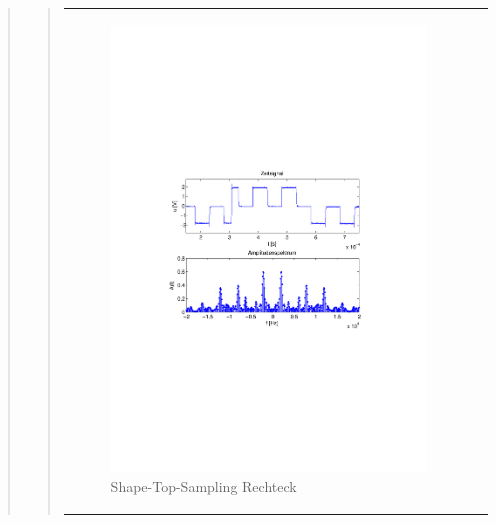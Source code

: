 \begin{quote}
\begin{quote}
\begin{center}
\begin{tabular}{ll}
            \hspace{-5cm}
                \begin{minipage}{0.6\textwidth}
                    \begin{figure}[H]
                        \includegraphics[scale=0.55, trim = 16mm 70mm 16mm 85mm, clip]{Bilder/shapeskizze}
                          \caption{Shape-Top-Sampling Rechteck}
                          \label{fig:shaperec}
                    \end{figure}
                \end{minipage}
                

\end{tabular}
\end{center}
\end{quote}
\end{quote}
